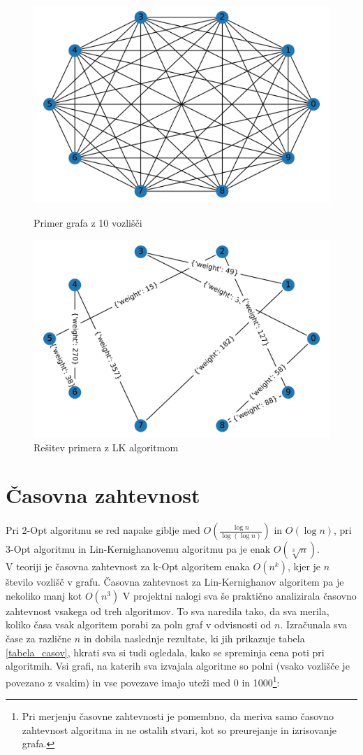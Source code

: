 \documentclass[12pt, a4paper]{article}
\begin{document}
\begin{figure}[!h]
    
    \begin{minipage}{0.5\textwidth}
    \includegraphics[width=7 cm]{primeri/primer2.png}
    \caption{Primer grafa z 10 vozlišči}
    \label{primer_LK}
  \end{minipage}
 \hspace{1cm}
  \begin{minipage}{0.5\textwidth}
    \includegraphics[width=7 cm]{primeri/primer2_lk.png}
    \caption{Rešitev primera z LK algoritmom}
    \label{resitev_LK}
  \end{minipage}
    
\end{figure}
\newpage
\section[Časovna zahtevnost]{Časovna zahtevnost}
Pri 2-Opt algoritmu se red napake giblje med $O(\frac{\log n}{\log (\log n)} )$ in $O(\log n)$, pri 3-Opt algoritmu in Lin-Kernighanovemu algoritmu pa je enak $O(\sqrt[3]{n})$. 
\\

V teoriji je časovna zahtevnost za k-Opt algoritem enaka $O(n^{k})$, kjer je $n$ število vozlišč v grafu. Časovna zahtevnost za Lin-Kernighanov algoritem pa je nekoliko manj kot $O(n^{3})$
V projektni nalogi sva še praktično analizirala časovno zahtevnost vsakega od treh algoritmov. To sva naredila tako, da sva merila, koliko časa vsak algoritem porabi za poln graf v odvisnosti od $n$. Izračunala sva čase za različne $n$ in dobila naslednje rezultate, ki jih prikazuje tabela \ref{tabela_casov}, hkrati sva si tudi ogledala, kako se spreminja cena poti pri algoritmih. Vsi grafi, na katerih sva izvajala algoritme so polni (vsako vozlišče je povezano z vsakim) in vse povezave imajo uteži med 0 in 1000\footnote{Pri merjenju časovne zahtevnosti je pomembno, da meriva samo časovno zahtevnost algoritma in ne ostalih stvari, kot so preurejanje in izrisovanje grafa.}:
\end{document}
